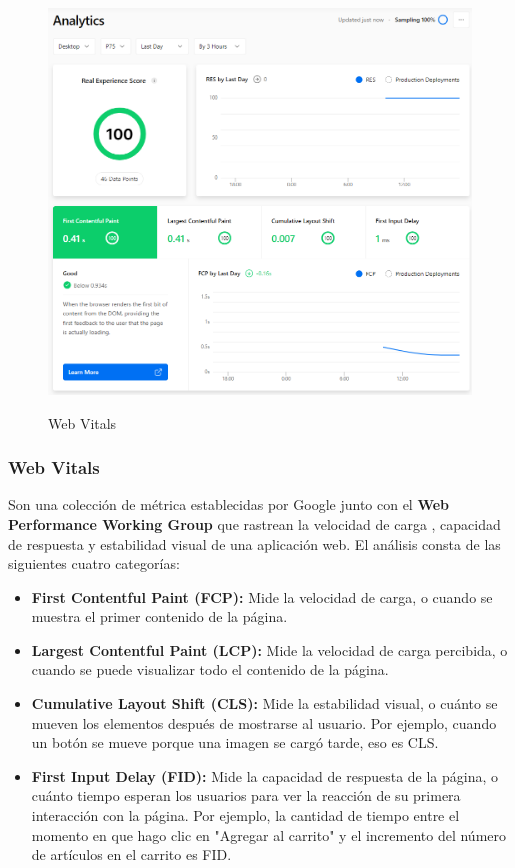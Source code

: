 \documentclass[12pt,twoside,titlepage]{report}
\begin{document}
{\begin{figure}[H]
    \centering
    \includegraphics[scale=0.5]{Vercel/RealExperienceScore}
    \label{fig:Vercel_metrics}
    \caption{Web Vitals}
\end{figure}

\subsubsection{Web Vitals}

Son una colección de métrica establecidas por Google \cite{webdev} junto con el \textbf{Web Performance Working Group} \cite{w3} que rastrean la velocidad de carga , capacidad de respuesta y estabilidad visual de una aplicación web. El análisis consta de las siguientes cuatro categorías:

\begin{itemize}
    \item\textbf{First Contentful Paint (FCP):} Mide la velocidad de carga, o cuando se muestra el primer contenido de la página.
    \item\textbf{Largest Contentful Paint (LCP):} Mide la velocidad de carga percibida, o cuando se puede visualizar todo el contenido de la página.
    \item\textbf{Cumulative Layout Shift (CLS):} Mide la estabilidad visual, o cuánto se mueven los elementos después de mostrarse al usuario. Por ejemplo, cuando un botón se mueve porque una imagen se cargó tarde, eso es CLS.
    \item\textbf{First Input Delay (FID):} Mide la capacidad de respuesta de la página, o cuánto tiempo esperan los usuarios para ver la reacción de su primera interacción con la página. Por ejemplo, la cantidad de tiempo entre el momento en que hago clic en "Agregar al carrito" y el incremento del número de artículos en el carrito es FID.
\end{itemize}

}
\end{document}
